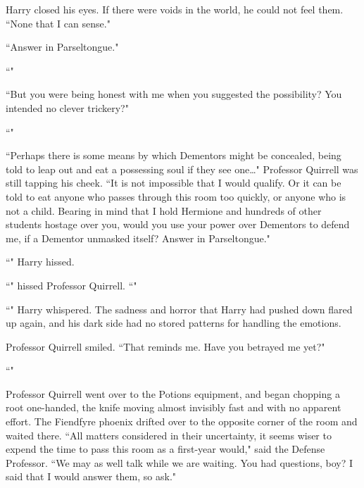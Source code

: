 Harry closed his eyes. If there were voids in the world, he could not feel them. ``None that I can sense."

``Answer in Parseltongue."

``"

``But you were being honest with me when you suggested the possibility? You intended no clever trickery?"

``"

``Perhaps there is some means by which Dementors might be concealed, being told to leap out and eat a possessing soul if they see one{\ldots}" Professor Quirrell was still tapping his cheek. ``It is not impossible that I would qualify. Or it can be told to eat anyone who passes through this room too quickly, or anyone who is not a child. Bearing in mind that I hold Hermione and hundreds of other students hostage over you, would you use your power over Dementors to defend me, if a Dementor unmasked itself? Answer in Parseltongue."

``" Harry hissed.

``" hissed Professor Quirrell. ``"

``" Harry whispered. The sadness and horror that Harry had pushed down flared up again, and his dark side had no stored patterns for handling the emotions. 

Professor Quirrell smiled. ``That reminds me. Have you betrayed me yet?"

``"

Professor Quirrell went over to the Potions equipment, and began chopping a root one-handed, the knife moving almost invisibly fast and with no apparent effort. The Fiendfyre phoenix drifted over to the opposite corner of the room and waited there. ``All matters considered in their uncertainty, it seems wiser to expend the time to pass this room as a first-year would," said the Defense Professor. ``We may as well talk while we are waiting. You had questions, boy? I said that I would answer them, so ask."

